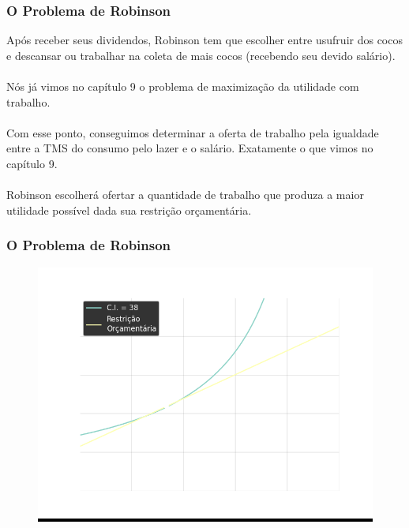 \documentclass{beamer}[10]
\begin{document}
\begin{frame}
	\frametitle{O Problema de Robinson}

	Após receber seus dividendos, Robinson tem que escolher entre usufruir dos cocos e descansar ou trabalhar na coleta de mais cocos (recebendo seu devido salário).
	\\~\\
	Nós já vimos no capítulo 9 o problema de maximização da utilidade com trabalho.
	\\~\\
	Com esse ponto, conseguimos determinar a oferta de trabalho pela igualdade entre a TMS do consumo pelo lazer e o salário. Exatamente o que vimos no capítulo 9.
	\\~\\	
	Robinson escolherá ofertar a quantidade de trabalho que produza a maior utilidade possível dada sua restrição orçamentária.

\end{frame}

\begin{frame}
	\frametitle{O Problema de Robinson}

	\begin{figure}[H]
		\centering
		\colorbox{black}{\includegraphics[scale=0.6]{cap33_4-max_trabalho.png}}
	\end{figure}	

\end{frame}
\end{document}
